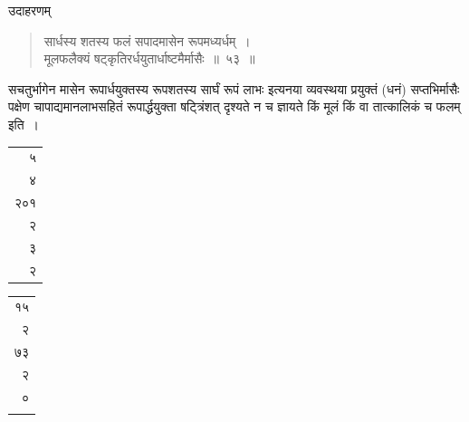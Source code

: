 \documentclass[10pt, openany]{book}
\begin{document}
{\vspace{0.3cm} {उदाहरणम्\textemdash}

\begin{quote}
    
{\eg सार्धस्य शतस्य फलं सपादमासेन रूपमध्यर्धम्~। \\
 मूलफलैक्यं षट्कृतिरर्धयुतार्धाष्टमैर्मासैः~॥~५३~॥}\end{quote}

{सचतुर्भागेन मासेन रूपार्धयुक्तस्य रूपशतस्य सार्घं रूपं लाभः इत्यनया
व्यवस्थया}
{प्रयुक्तं (धनं) सप्तभिर्मासैः पक्षेण चापाद्यमानलाभसहितं रूपार्द्धयुक्ता
षट्त्रिंशत् दृश्यते न च}
{ज्ञायते किं मूलं किं वा तात्कालिकं च फलम् इति~।}


\vspace{0.1cm}
\hspace{40mm} \begin{tabular}{r|}५ \\४ \\२०१ \\२ \\३ \\२ \end{tabular}
\begin{tabular}{r}१५\\२\\७३\\२\\० \\ \\\end{tabular}

}
\end{document}
